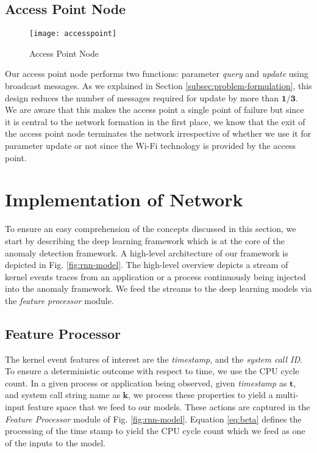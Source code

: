 \subsection{Access Point Node}
\begin{figure}[!t]
	\centering
	\texttt{[image: accesspoint]} 
	\caption{Access Point Node}
	\label{fig:access-point}
\end{figure}
Our access point node performs two functions: parameter 
\emph{query} and \emph{update} using broadcast messages. As 
we explained in Section \ref{subsec:problem-formulation}, 
this design reduces the number of messages required for 
update by more than $ \bm{1/3} $. We are aware that this 
makes the access point a single point of failure but since it 
is central to the network formation in the first place, we 
know that the exit of the access point node terminates the 
network irrespective of whether we use it for parameter 
update or not since the Wi-Fi technology is provided by the 
access point.
\section{Implementation of Network}
\label{sec:implementation}
To ensure an easy comprehension of the concepts discussed in 
this section, we start by describing the deep learning 
framework which is at the core of the anomaly detection 
framework. A high-level architecture of our framework is 
depicted in Fig. 
\ref{fig:rnn-model}. The 
high-level 
overview depicts a stream of kernel events traces from an 
application or a process continuously being injected into the 
anomaly framework.
We feed the streams to the deep learning models via the 
\emph{feature 
	processor} module. 

\subsection{Feature Processor}
The kernel event features of interest are the 
\emph{timestamp}, and the \emph{system call ID}. To ensure a 
deterministic 
outcome with respect to time, we use the 
CPU cycle count. In a given process or application being 
observed, given \emph{timestamp} 
as $\mathbf{t} $, and system call string name as $ \mathbf{k} 
$, we process these properties to 
yield a multi-input feature space that we feed to our models. 
These actions are captured in the \emph{Feature Processor} 
module of Fig. \ref{fig:rnn-model}. Equation 
\eqref{eq:beta} defines the processing of the time stamp to 
yield the CPU cycle count which we feed as one of the inputs 
to the model.

